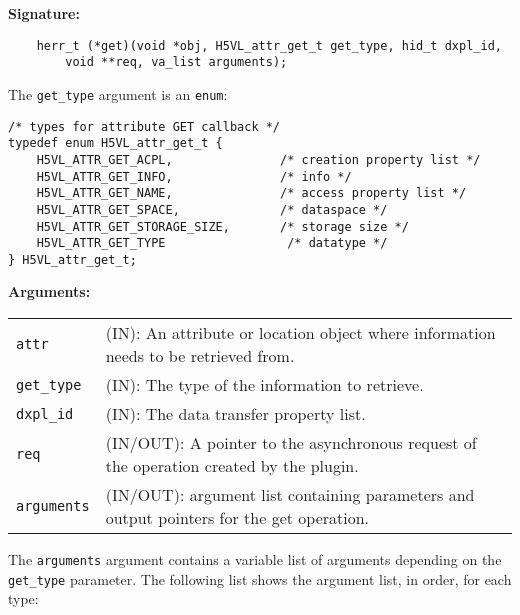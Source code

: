 \begin{mdframed}[style=bgbox]
\textbf{Signature:}
\begin{lstlisting}
    herr_t (*get)(void *obj, H5VL_attr_get_t get_type, hid_t dxpl_id, 
        void **req, va_list arguments);
\end{lstlisting}

The \texttt{get\_type} argument is an \texttt{enum}:
\begin{lstlisting}
/* types for attribute GET callback */
typedef enum H5VL_attr_get_t {
    H5VL_ATTR_GET_ACPL,               /* creation property list */
    H5VL_ATTR_GET_INFO,               /* info */
    H5VL_ATTR_GET_NAME,               /* access property list */
    H5VL_ATTR_GET_SPACE,              /* dataspace */
    H5VL_ATTR_GET_STORAGE_SIZE,       /* storage size */
    H5VL_ATTR_GET_TYPE                 /* datatype */
} H5VL_attr_get_t;
\end{lstlisting}

\textbf{Arguments:}\\
\begin{tabular}{l p{13.5cm}}
  \texttt{attr} & (IN): An attribute or location object where information
  needs to be retrieved from.\\
  \texttt{get\_type} & (IN): The type of the information to retrieve.\\
  \texttt{dxpl\_id} & (IN): The data transfer property list.\\
  \texttt{req} & (IN/OUT): A pointer to the asynchronous request of the
  operation created by the plugin.\\
  \texttt{arguments} & (IN/OUT): argument list containing parameters and
  output pointers for the get operation. \\
\end{tabular}
\end{mdframed}

The \texttt{arguments} argument contains a variable list of arguments
depending on the \texttt{get\_type} parameter. The following list shows
the argument list, in order, for each type:

